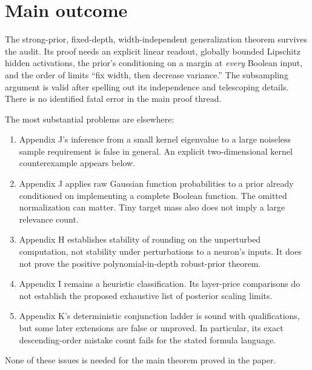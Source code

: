 \documentclass[11pt]{article}
\begin{document}
\section*{Main outcome}
The strong-prior, fixed-depth, width-independent generalization theorem survives the audit. Its proof needs an explicit linear readout, globally bounded Lipschitz hidden activations, the prior's conditioning on a margin at \emph{every} Boolean input, and the order of limits ``fix width, then decrease variance.'' The subsampling argument is valid after spelling out its independence and telescoping details. There is no identified fatal error in the main proof thread.

The most substantial problems are elsewhere:
\begin{enumerate}
\item Appendix J's inference from a small kernel eigenvalue to a large noiseless sample requirement is false in general. An explicit two-dimensional kernel counterexample appears below.
\item Appendix J applies raw Gaussian function probabilities to a prior already conditioned on implementing a complete Boolean function. The omitted normalization can matter. Tiny target mass also does not imply a large relevance count.
\item Appendix H establishes stability of rounding on the unperturbed computation, not stability under perturbations to a neuron's inputs. It does not prove the positive polynomial-in-depth robust-prior theorem.
\item Appendix I remains a heuristic classification. Its layer-price comparisons do not establish the proposed exhaustive list of posterior scaling limits.
\item Appendix K's deterministic conjunction ladder is sound with qualifications, but some later extensions are false or unproved. In particular, its exact descending-order mistake count fails for the stated formula language.
\end{enumerate}
None of these issues is needed for the main theorem proved in the paper.
\end{document}
